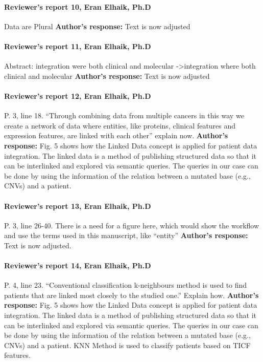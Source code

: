 \documentclass{bmcart}
\begin{document}
\paragraph {Reviewer's report 10, Eran Elhaik, Ph.D}
Data are Plural
\newline \textbf{Author's response:}
Text is now adjusted

\paragraph {Reviewer's report 11, Eran Elhaik, Ph.D}
Abstract: integration were both clinical and molecular ->integration where both clinical and molecular
\newline \textbf{Author's response:}
Text is now adjusted


\paragraph {Reviewer's report 12, Eran Elhaik, Ph.D}
P. 3, line 18. “Through combining data from multiple cancers in this way we create a network of data where entities, like proteins, clinical features and expression features, are linked with each other” explain now.
\newline \textbf{Author's response:}
Fig. 5 shows how the Linked Data concept is applied for patient data integration. The linked data is a method of publishing structured data so that it can be interlinked and explored via semantic queries. The queries in our case can be done by using the information of the relation between a mutated base (e.g., CNVs) and a patient.


\paragraph {Reviewer's report 13, Eran Elhaik, Ph.D}
P. 3, line 26-40. There is a need for a figure here, which would show the workflow and use the terms used in this manuscript, like “entity”
\newline \textbf{Author's response:}
Text is now adjusted.

\paragraph {Reviewer's report 14, Eran Elhaik, Ph.D}
 P. 4, line 23. “Conventional classification k-neighbours method is used to find patients that are linked most closely to the studied one.” Explain how.
\newline \textbf{Author's response:}
Fig. 5 shows how the Linked Data concept is applied for patient data integration. The linked data is a method of publishing structured data so that it can be interlinked and explored via semantic queries. The queries in our case can be done by using the information of the relation between a mutated base (e.g., CNVs) and a patient.
KNN Method is used to classify patients based on TICF features.
\end{document}
